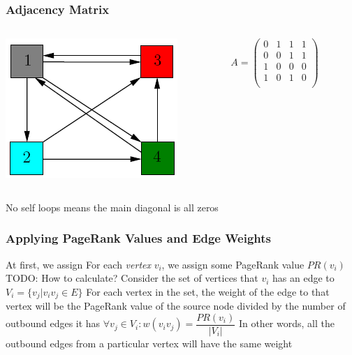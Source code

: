\documentclass{beamer}
\begin{document}
\begin{frame}
\frametitle{Adjacency Matrix}
\begin{columns}
    \begin{column}{0.5\textwidth}
        \centering
        \includegraphics[width=\textwidth]{unweighted.png}
    \end{column}
    \begin{column}{0.5\textwidth}
        \centering
        {\Large$A = \begin{pmatrix}
            0 & 1 & 1 & 1\\
            0 & 0 & 1 & 1\\
            1 & 0 & 0 & 0\\
            1 & 0 & 1 & 0\\
        \end{pmatrix}$}
    \end{column}
\end{columns}
\begin{outline}
    \1 No self loops means the main diagonal is all zeros
\end{outline}
\end{frame}
\begin{frame}[t]
\frametitle{Applying PageRank Values and Edge Weights}
\begin{outline}
    \1 At first, we assign 
    \1 For each \emph{vertex} $v_i$, we assign some PageRank value $PR(v_i)$    
        \2 TODO: How to calculate?
    \1 Consider the set of vertices that $v_i$ has an edge to 
        \2 $V_i = \{v_j | v_iv_j \in E\}$
    \1 For each vertex in the set, the weight of the edge to that vertex will be the PageRank value of the source node divided by the number of outbound edges it has
        \2 $\forall v_j \in V_i: w(v_iv_j) = \dfrac{PR(v_i)}{|V_i|}$
    \1 In other words, all the outbound edges from a particular vertex will have the same weight
\end{outline}
\end{frame}
\end{document}
